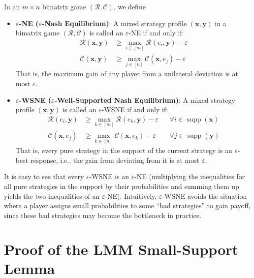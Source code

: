 In an $m \times n$ bimatrix game $(\mathcal{R}, \mathcal{C})$, we define
\begin{itemize}
  \item \textbf{$\varepsilon$-NE ($\varepsilon$-Nash Equilibrium)}: A mixed strategy profile $(\mathbf{x}, \mathbf{y})$ in a bimatrix game $(\mathcal{R}, \mathcal{C})$ is called an $\varepsilon$-NE if and only if:
        \begin{align*}
          \mathcal{R}(\mathbf{x}, \mathbf{y}) & \ge \max_{i \in [m]} \mathcal{R}(e_i, \mathbf{y}) - \varepsilon \\
          \mathcal{C}(\mathbf{x}, \mathbf{y}) & \ge \max_{j \in [n]} \mathcal{C}(\mathbf{x}, e_j) - \varepsilon
        \end{align*}
        That is, the maximum gain of any player from a unilateral deviation is at most $\varepsilon$.

  \item \textbf{$\varepsilon$-WSNE ($\varepsilon$-Well-Supported Nash Equilibrium)}: A mixed strategy profile $(\mathbf{x}, \mathbf{y})$ is called an $\varepsilon$-WSNE if and only if:
        \begin{align*}
          \mathcal{R}(e_i, \mathbf{y}) & \ge \max_{k \in [m]} \mathcal{R}(e_k, \mathbf{y}) - \varepsilon &  & \forall i \in \operatorname{supp}(\mathbf{x}) \\
          \mathcal{C}(\mathbf{x}, e_j) & \ge \max_{k \in [n]} \mathcal{C}(\mathbf{x}, e_k) - \varepsilon &  & \forall j \in \operatorname{supp}(\mathbf{y})
        \end{align*}
        That is, every pure strategy in the support of the current strategy is an $\varepsilon$-best response, i.e., the gain from deviating from it is at most $\varepsilon$.
\end{itemize}

It is easy to see that every $\varepsilon$-WSNE is an $\varepsilon$-NE (multiplying the inequalities for all pure strategies in the support by their probabilities and summing them up yields the two inequalities of an $\varepsilon$-NE). Intuitively, $\varepsilon$-WSNE avoids the situation where a player assigns small probabilities to some ``bad strategies'' to gain payoff, since these bad strategies may become the bottleneck in practice.


\section{Proof of the LMM Small-Support Lemma}
\label{app:lmm-proof}


